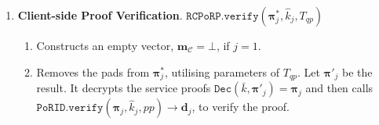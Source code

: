 \begin{enumerate}
%
%



\


\item \textbf{Client-side Proof Verification}.\label{Client-sideProofVerification} $\mathtt{RCPoRP}.\mathtt{verify}(\bm{\pi}^{\scriptscriptstyle *}_{\scriptscriptstyle j}, \hat{k}_{\scriptscriptstyle j},T_{\scriptscriptstyle qp})$
\begin{enumerate}


\item Constructs an empty vector, $\bm{m}_{\scriptscriptstyle\mathcal C}=\bot$, if $j=1$. 

\item Removes the pads from $\bm{\pi}^{\scriptscriptstyle *}_{\scriptscriptstyle j}$, utilising  parameters of $T_{\scriptscriptstyle qp}$. Let $\bm{\pi}'_{\scriptscriptstyle j}$ be the result. It decrypts the service proofs $\mathtt{Dec}(\bar{k},\bm{\pi}'_{\scriptscriptstyle j})=\bm{\pi}_{\scriptscriptstyle j}$ and then calls $\mathtt{PoRID.verify}(\bm{\pi}_{\scriptscriptstyle j}, \hat{k}_{\scriptscriptstyle j}, {pp})\rightarrow \bm{d}_{\scriptscriptstyle j}$, to verify the proof.  


\end{enumerate}
\end{enumerate}
